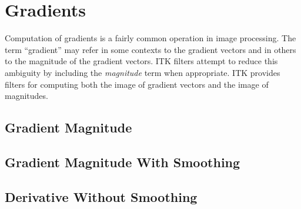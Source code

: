 




\section{Gradients}
\label{sec:GradientFiltering}

Computation of gradients is a fairly common operation in image processing. The
term ``gradient'' may refer in some contexts to the gradient vectors and in
others to the magnitude of the gradient vectors. ITK filters attempt to
reduce this ambiguity by including the \emph{magnitude} term when
appropriate. ITK provides filters for computing both the image of gradient
vectors and the image of magnitudes.

\subsection{Gradient Magnitude}
\label{sec:GradientMagnitudeImageFilter}

\ifitkFullVersion

\fi

\subsection{Gradient Magnitude With Smoothing}
\label{sec:GradientMagnitudeRecursiveGaussianImageFilter}

\ifitkFullVersion

\fi


\subsection{Derivative Without Smoothing}
\label{sec:DerivativeImageFilter}

